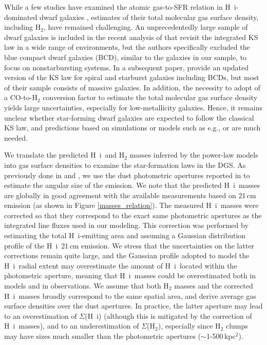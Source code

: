 \documentclass{aa}
\newcommand{\hi}{H~{\sc i}}
\begin{document}
While a few studies have examined the atomic gas-to-SFR relation in \hi-dominated dwarf galaxies \citep[see e.g.,][]{Bigiel_2008}, estimates of their total molecular gas surface density, including H$_2$, have remained challenging. An unprecedentedly large sample of dwarf galaxies is included in the recent analysis of \cite{Reyes_Kennicutt_2019} that revisit the integrated KS law in a wide range of environments, but the authors specifically excluded the blue compact dwarf galaxies (BCD), similar to the galaxies in our sample, to focus on nonstarbursting systems. In a subsequent paper, \cite{Kennicutt_Reyes_2021} provide an updated version of the KS law for spiral and starburst galaxies including BCDs, but most of their sample consists of massive galaxies. In addition, the necessity to adopt of a CO-to-H$_2$ conversion factor to estimate the total molecular gas surface density yields large uncertainties, especially for low-metallicity galaxies. 
Hence, it remains unclear whether star-forming dwarf galaxies are expected to follow the classical KS law, and predictions based on simulations \citep[such as e.g.,][]{Whitworth_KS_2022} or models such as e.g.,\citealt{Cormier_2014} or  are much needed. 

We translate the predicted \hi\ and H$_2$ masses inferred by the power-law models into gas surface densities to examine the star-formation laws in the DGS. As previously done in \cite{Cormier_2014} and , we use the dust photometric apertures reported in \cite{remy-ruyer_linking_2015} to estimate the angular size of the emission. We note that the predicted \hi\ masses are globally in good agreement with the available measurements based on 21\,cm emission (as shown in Figure \ref{masses_relation}). The measured \hi\ masses were corrected so that they correspond to the exact same photometric apertures as the integrated line fluxes used in our modeling. This correction was performed by estimating the total \hi-emitting area and assuming a Gaussian distribution profile of the \hi\ 21\,cm emission. We stress that the uncertainties on the latter corrections remain quite large, and the Gaussian profile adopted to model the \hi\ radial extent may overestimate the amount of \hi\ located within the photometric aperture, meaning that \hi\ masses could be overestimated both in models and in observations. We assume that both H$_2$ masses and the corrected \hi\ masses broadly correspond to the same spatial area, and derive average gas surface densities over the dust apertures. In practice, the latter aperture may lead to an overestimation of $\Sigma$(\hi) (although this is mitigated by the correction of \hi\ masses), and to an underestimation of $\Sigma$(H$_2$), especially since H$_2$ clumps may have sizes much smaller than the photometric apertures ($\sim$1-500\,kpc$^2$).
\end{document}
